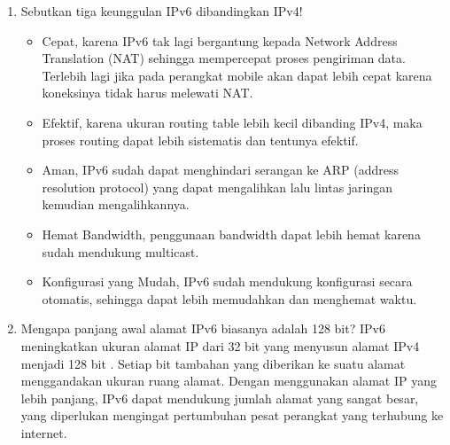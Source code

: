\begin{enumerate}
    \item Sebutkan tiga keunggulan IPv6 dibandingkan IPv4!
        \begin{itemize}
            \item Cepat, karena IPv6 tak lagi bergantung kepada Network Address Translation (NAT) sehingga mempercepat proses pengiriman data. Terlebih lagi jika pada perangkat mobile akan dapat lebih cepat karena koneksinya tidak harus melewati NAT.
            \item Efektif, karena ukuran routing table lebih kecil dibanding IPv4, maka proses routing dapat lebih sistematis dan tentunya efektif.
            \item Aman, IPv6 sudah dapat menghindari serangan ke ARP (address resolution protocol) yang dapat mengalihkan lalu lintas jaringan kemudian mengalihkannya.
            \item Hemat Bandwidth, penggunaan bandwidth dapat lebih hemat karena sudah mendukung multicast.
            \item Konfigurasi yang Mudah, IPv6 sudah mendukung konfigurasi secara otomatis, sehingga dapat lebih memudahkan dan menghemat waktu.
        \end{itemize}
    
    \item Mengapa panjang awal alamat IPv6 biasanya adalah 128 bit?
    IPv6 meningkatkan ukuran alamat IP dari 32 bit yang menyusun alamat IPv4 menjadi 128 bit . Setiap bit tambahan yang diberikan ke suatu alamat menggandakan ukuran ruang alamat. Dengan menggunakan alamat IP yang lebih panjang, IPv6 dapat mendukung jumlah alamat yang sangat besar, yang diperlukan mengingat pertumbuhan pesat perangkat yang terhubung ke internet.
        
\end{enumerate}